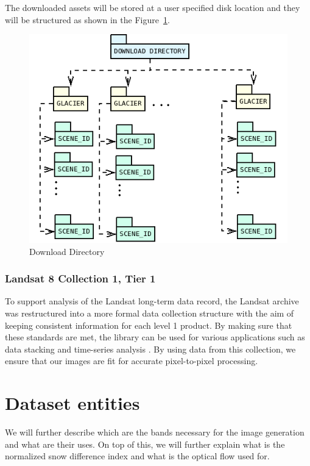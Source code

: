 \documentclass[12pt, a4paper]{report}
\begin{document}
	\par The downloaded assets will be stored at a user specified disk location and they will be structured as shown in the Figure~\ref{fig:DownloadDirectory}.
	\begin{figure}[h]
		\centering
		\includegraphics[scale=0.4]{../images/DownloadDirectory.png}
		\caption{Download Directory}
		\label{fig:DownloadDirectory}
	\end{figure}
	
	\subsubsection{Landsat 8 Collection 1, Tier 1}
	
	\par To support analysis  of the Landsat long-term data record, the Landsat archive was restructured into a more formal data collection structure with the aim of keeping consistent information for each level 1 product. By making sure that these standards are met, the library can be used for various applications such as data stacking and time-series analysis \cite{lc1l1}. By using data from this collection, we ensure that our images are fit for accurate pixel-to-pixel processing.
	
	\section{Dataset entities}
	
	\par We will further describe which are the bands necessary for the image generation and what are their uses. On top of this, we will further explain what is the normalized snow difference index and what is the optical flow used for.
	
\end{document}
